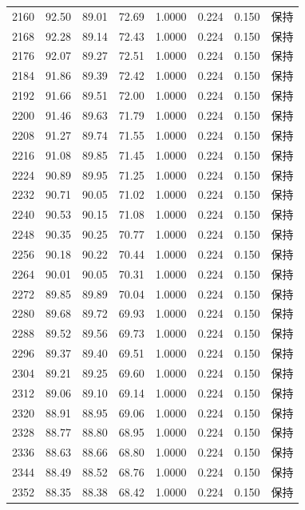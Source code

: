 \begin{longtable}{rrrrrrrr}
2160 & 92.50 & 89.01 & 72.69 & 1.0000 & 0.224 & 0.150 & 保持 \\
2168 & 92.28 & 89.14 & 72.43 & 1.0000 & 0.224 & 0.150 & 保持 \\
2176 & 92.07 & 89.27 & 72.51 & 1.0000 & 0.224 & 0.150 & 保持 \\
2184 & 91.86 & 89.39 & 72.42 & 1.0000 & 0.224 & 0.150 & 保持 \\
2192 & 91.66 & 89.51 & 72.00 & 1.0000 & 0.224 & 0.150 & 保持 \\
2200 & 91.46 & 89.63 & 71.79 & 1.0000 & 0.224 & 0.150 & 保持 \\
2208 & 91.27 & 89.74 & 71.55 & 1.0000 & 0.224 & 0.150 & 保持 \\
2216 & 91.08 & 89.85 & 71.45 & 1.0000 & 0.224 & 0.150 & 保持 \\
2224 & 90.89 & 89.95 & 71.25 & 1.0000 & 0.224 & 0.150 & 保持 \\
2232 & 90.71 & 90.05 & 71.02 & 1.0000 & 0.224 & 0.150 & 保持 \\
2240 & 90.53 & 90.15 & 71.08 & 1.0000 & 0.224 & 0.150 & 保持 \\
2248 & 90.35 & 90.25 & 70.77 & 1.0000 & 0.224 & 0.150 & 保持 \\
2256 & 90.18 & 90.22 & 70.44 & 1.0000 & 0.224 & 0.150 & 保持 \\
2264 & 90.01 & 90.05 & 70.31 & 1.0000 & 0.224 & 0.150 & 保持 \\
2272 & 89.85 & 89.89 & 70.04 & 1.0000 & 0.224 & 0.150 & 保持 \\
2280 & 89.68 & 89.72 & 69.93 & 1.0000 & 0.224 & 0.150 & 保持 \\
2288 & 89.52 & 89.56 & 69.73 & 1.0000 & 0.224 & 0.150 & 保持 \\
2296 & 89.37 & 89.40 & 69.51 & 1.0000 & 0.224 & 0.150 & 保持 \\
2304 & 89.21 & 89.25 & 69.60 & 1.0000 & 0.224 & 0.150 & 保持 \\
2312 & 89.06 & 89.10 & 69.14 & 1.0000 & 0.224 & 0.150 & 保持 \\
2320 & 88.91 & 88.95 & 69.06 & 1.0000 & 0.224 & 0.150 & 保持 \\
2328 & 88.77 & 88.80 & 68.95 & 1.0000 & 0.224 & 0.150 & 保持 \\
2336 & 88.63 & 88.66 & 68.80 & 1.0000 & 0.224 & 0.150 & 保持 \\
2344 & 88.49 & 88.52 & 68.76 & 1.0000 & 0.224 & 0.150 & 保持 \\
2352 & 88.35 & 88.38 & 68.42 & 1.0000 & 0.224 & 0.150 & 保持 \\

\end{longtable}
